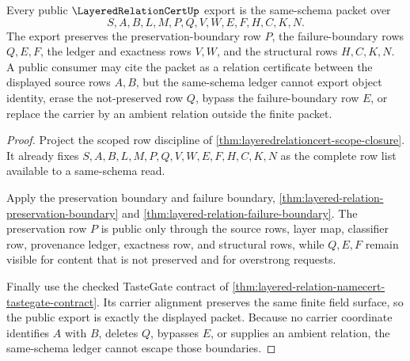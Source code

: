 \begin{theorem}
\label{thm:layered-relation-cert-public-export}
Every public $\LayeredRelationCertUp$ export is the same-schema packet over
$$
S,A,B,L,M,P,Q,V,W,E,F,H,C,K,N .
$$
The export preserves the preservation-boundary row $P$, the failure-boundary rows $Q,E,F$, the ledger and exactness rows $V,W$, and the structural rows $H,C,K,N$. A public consumer may cite the packet as a relation certificate between the displayed source rows $A,B$, but the same-schema ledger cannot export object identity, erase the not-preserved row $Q$, bypass the failure-boundary row $E$, or replace the carrier by an ambient relation outside the finite packet.
\end{theorem}
\begin{proof}
Project the scoped row discipline of \autoref{thm:layeredrelationcert-scope-closure}. It already fixes $S,A,B,L,M,P,Q,V,W,E,F,H,C,K,N$ as the complete row list available to a same-schema read.

Apply the preservation boundary and failure boundary, \autoref{thm:layered-relation-preservation-boundary} and \autoref{thm:layered-relation-failure-boundary}. The preservation row $P$ is public only through the source rows, layer map, classifier row, provenance ledger, exactness row, and structural rows, while $Q,E,F$ remain visible for content that is not preserved and for overstrong requests.

Finally use the checked TasteGate contract of \autoref{thm:layered-relation-namecert-tastegate-contract}. Its carrier alignment preserves the same finite field surface, so the public export is exactly the displayed packet. Because no carrier coordinate identifies $A$ with $B$, deletes $Q$, bypasses $E$, or supplies an ambient relation, the same-schema ledger cannot escape those boundaries.
\end{proof}



